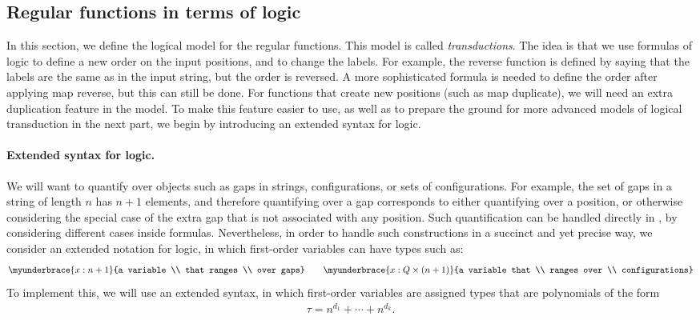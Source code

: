 \subsection{Regular functions in terms of logic}
\label{sec:mso-transductions}
In this section, we define the logical model for the regular functions. This model is called \emph{\mso transductions}. The idea is that we use formulas of \mso logic to define a new order on the input positions, and to change the labels. For example, the reverse function is defined by saying that the labels are the same as in the input string, but the order is reversed. A more sophisticated formula is needed to define the order after applying map reverse, but this can still be done. For functions that create new positions (such as map duplicate), we will need an extra duplication feature in the model. To make this feature easier to use, as well as to prepare the ground for more advanced models  of logical transduction in the next part, we begin by introducing an extended syntax for \mso logic. 

\paragraph*{Extended syntax for \mso logic.} We will want to quantify over objects such as gaps in strings,  configurations,  or sets of configurations.  For example, the set of gaps in a string of length $n$ has $n+1$ elements, and therefore quantifying over a gap corresponds to either quantifying over a position, or otherwise considering the special case of the extra gap that is not associated with any position. Such quantification can be handled directly in \mso, by considering different cases inside formulas. Nevertheless, in order to handle such constructions  in a succinct and yet precise way, we consider an extended notation for \mso logic, in which first-order  variables can have types such as:
\begin{align}\label{eq:examples-of-type-variables}
\myunderbrace{ x : n+1}{a variable \\ that ranges \\ over gaps}
\qquad 
\myunderbrace{ x : Q \times (n+1)}{a variable  that \\ ranges  over \\ configurations}
\end{align}
To implement this, we will use an extended syntax, in which first-order variables are assigned types that are polynomials of the form 
\begin{align*}
\tau = n^{d_1} + \cdots + n^{d_k}.\end{align*}  

